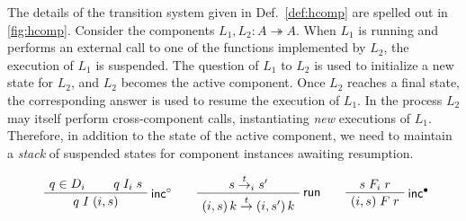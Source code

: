 \documentclass[sigplan,10pt,review]{acmart}
\newcommand{\figsize}{\small}
\newcommand{\kw}[1]{\ensuremath{ \mathsf{#1} }}
\newcommand{\que}{\circ}
\newcommand{\ans}{\bullet}
\begin{document}
The details of the transition system
given in Def.~\ref{def:hcomp}
are spelled out in \autoref{fig:hcomp}.
Consider the components $L_1, L_2 : A \twoheadrightarrow A$.
When $L_1$ is running and performs an external call
to one of the functions implemented by $L_2$,
the execution of $L_1$ is suspended.
The question of $L_1$ to $L_2$
is used to initialize a new state for $L_2$,
and $L_2$ becomes the active component.
Once $L_2$ reaches a final state,
the corresponding answer is used to resume
the execution of $L_1$.
In the process
$L_2$ may itself perform cross-component calls,
instantiating \emph{new} executions of $L_1$.
Therefore,
in addition to the state of the active component,
we need to maintain a \emph{stack} of suspended states
for component instances awaiting resumption.

\begin{figure*} %
  \figsize
  \begin{minipage}{0.6\textwidth}
    \begin{gather*}
        \AxiomC{$q \in D_i$}
        \AxiomC{$q \mathrel{I_i} s$}
        \RightLabel{$\kw{inc}^\que$}
        \BinaryInfC{$q \mathrel{I} (i, s)$}
        \DisplayProof
        \qquad
        \AxiomC{$s \stackrel{t}{\rightarrow}_i s'$}
        \RightLabel{$\kw{run}$}
        \UnaryInfC{$
            (i, s) \, k
            \stackrel{t}{\rightarrow}
            (i, s') \, k$}
        \DisplayProof
        \qquad
        \AxiomC{$s \mathrel{F_i} r$}
        \RightLabel{$\kw{inc}^\ans$}
        \UnaryInfC{$(i, s) \mathrel{F} r$}
        \DisplayProof
        \\[1em]
        \AxiomC{$s \mathrel{X_i} q$}
        \AxiomC{$q \in D_j$}
        \AxiomC{$q \mathrel{I_j} s'$}

\end{gather*}
\end{minipage}
\end{figure*}
\end{document}
